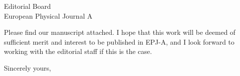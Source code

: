 \documentclass{letter} %
\begin{document}
\begin{letter}{
Editorial Board \\
European Physical Journal A}




Please find our manuscript attached.  I hope that this work will be deemed of sufficient merit and interest to be published in EPJ-A, and I look forward to working with the editorial staff if this is the case. 
 
\closing{Sincerely yours,} 
 
 

\end{letter}
 
\end{document}
